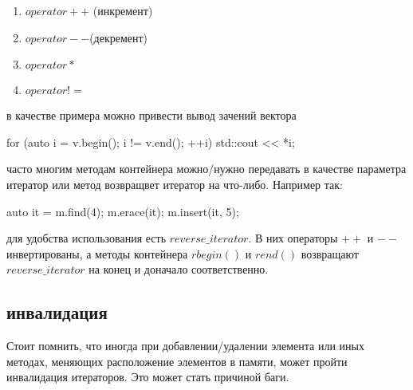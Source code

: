 \begin{enumerate}
\item $operator ++$ (инкремент)
\item $operator -- $(декремент)
\item $operator *$
\item $operator !=$

\end{enumerate}
в качестве примера можно привести вывод зачений вектора
\begin{cppcode}
for (auto i = v.begin(); i != v.end(); ++i) {
	std::cout << *i;
}
\end{cppcode}
часто многим методам контейнера можно/нужно передавать в качестве параметра итератор или метод возвращвет итератор на что-либо. Например так:
\begin{cppcode}
auto it = m.find(4);
m.erace(it);
m.insert(it, 5);
\end{cppcode}
для удобства использования есть $reverse\_iterator$. В них операторы $++$ и $--$ инвертированы, а методы контейнера $rbegin()$ и $rend()$ возвращают $reverse\_iterator$ на конец и доначало соответственно.
\subsection{инвалидация}
Стоит помнить, что иногда при добавлении/удалении элемента или иных методах, меняющих расположение элементов в памяти, может пройти инвалидация итераторов. Это может стать причиной баги.